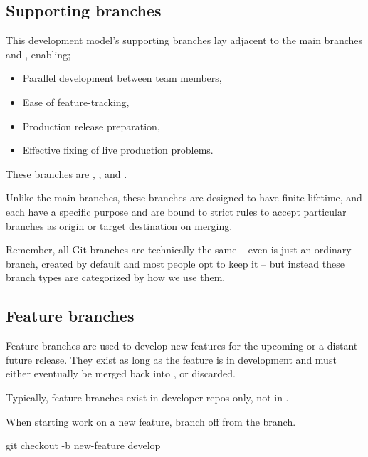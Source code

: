 \subsection{Supporting branches}

This development model’s supporting branches lay adjacent to the main branches  and , enabling;

\begin{itemize}
	\item Parallel development between team members,
	\item Ease of feature-tracking,
	\item Production release preparation,
	\item Effective fixing of live production problems.
\end{itemize}

\noindent These branches are , , and . \newline

Unlike the main branches, these branches are designed to have finite lifetime, and each have a specific purpose and are bound to strict rules to accept particular branches as origin or target destination on merging.

Remember, all Git branches are technically the same – even  is just an ordinary branch, created by default and most people opt to keep it – but instead these branch types are categorized by how we use them.



\subsection{Feature branches}

Feature branches are used to develop new features for the upcoming or a distant future release. They exist as long as the feature is in development and must either eventually be merged back into , or discarded. \newline

\noindent Typically, feature branches exist in developer repos only, not in . \newline

\noindent When starting work on a new feature, branch off from the  branch.

\begin{git-bash}
    git checkout -b new-feature develop
\end{git-bash}

